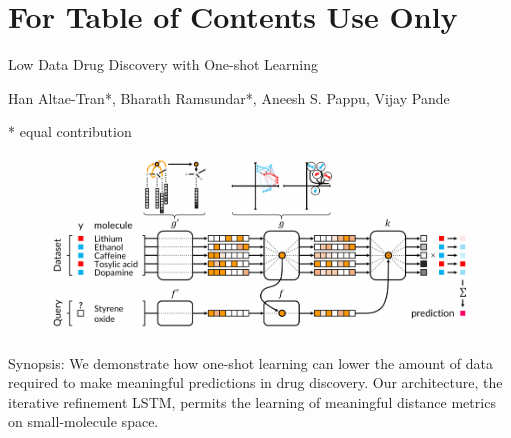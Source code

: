 \documentclass[journal=jacsat,manuscript=article]{achemso}
\begin{document}
\newpage
\section*{For Table of Contents Use Only}
{\huge \centering Low Data Drug Discovery with One-shot Learning}

{\Large Han Altae-Tran*, Bharath Ramsundar*, Aneesh S. Pappu, Vijay Pande}

* equal contribution

\begin{figure}[H]
\includegraphics{For_Table_Of_Contents_Only.png}
\end{figure}

Synopsis: We demonstrate how one-shot learning can lower the amount of data required to make meaningful predictions in drug discovery. Our architecture, the iterative refinement LSTM, permits the learning of meaningful distance metrics on small-molecule space.
\end{document}
